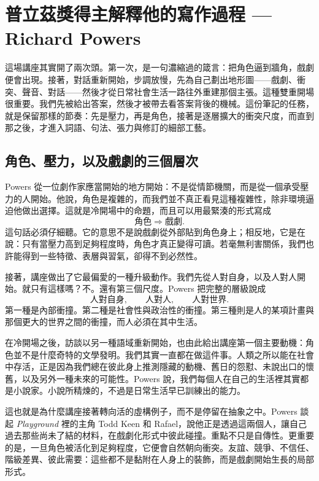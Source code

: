 \chapter{普立茲獎得主解釋他的寫作過程 --- Richard Powers}

這場講座其實開了兩次頭。第一次，是一句濃縮過的箴言：把角色逼到牆角，戲劇便會出現。接著，對話重新開始，步調放慢，先為自己劃出地形圖——戲劇、衝突、聲音、對話——然後才從日常社會生活一路往外重建那個主張。這種雙重開場很重要。我們先被給出答案，然後才被帶去看答案背後的機械。這份筆記的任務，就是保留那樣的節奏：先是壓力，再是角色，接著是逐層擴大的衝突尺度，而直到那之後，才進入詞語、句法、張力與修訂的細部工藝。

\section{角色、壓力，以及戲劇的三個層次}

Powers 從一位劇作家應當開始的地方開始：不是從情節機關，而是從一個承受壓力的人開始。他說，角色是複雜的，而我們並不真正看見這種複雜性，除非環境逼迫他做出選擇。這就是冷開場中的命題，而且可以用最緊湊的形式寫成
\begin{equation}
\text{角色} \Rightarrow \text{戲劇}.
\end{equation}
這句話必須仔細聽。它的意思不是說戲劇從外部貼到角色身上；相反地，它是在說：只有當壓力高到足夠程度時，角色才真正變得可讀。若毫無利害關係，我們也許能得到一些特徵、表層與習氣，卻得不到必然性。

接著，講座做出了它最偏愛的一種升級動作。我們先從人對自身，以及人對人開始。就只有這樣嗎？不。還有第三個尺度。Powers 把完整的層級說成
\begin{equation}
\text{人對自身},\qquad \text{人對人},\qquad \text{人對世界}.
\end{equation}
第一種是內部衝撞。第二種是社會性與政治性的衝撞。第三種則是人的某項計畫與那個更大的世界之間的衝撞，而人必須在其中生活。

在冷開場之後，訪談以另一種語域重新開始，也由此給出講座第一個主要動機：角色並不是什麼奇特的文學發明。我們其實一直都在做這件事。人類之所以能在社會中存活，正是因為我們總在彼此身上推測隱藏的動機、舊日的怨懟、未說出口的懷舊，以及另外一種未來的可能性。Powers 說，我們每個人在自己的生活裡其實都是小說家。小說所精煉的，不過是日常生活早已訓練出的能力。

這也就是為什麼講座接著轉向活的虛構例子，而不是停留在抽象之中。Powers 談起 \emph{Playground} 裡的主角 Todd Keen 和 Rafael，說他正是透過這兩個人，讓自己過去那些尚未了結的材料，在戲劇化形式中彼此碰撞。重點不只是自傳性。更重要的是，一旦角色被活化到足夠程度，它便會自然朝向衝突。友誼、競爭、不信任、階級差異、彼此需要：這些都不是黏附在人身上的裝飾，而是戲劇開始生長的局部形式。

